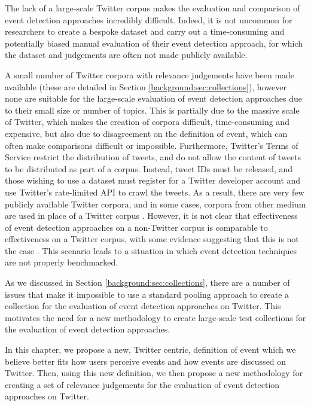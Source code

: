 The lack of a large-scale Twitter corpus makes the evaluation and comparison of event detection approaches incredibly difficult.
Indeed, it is not uncommon for researchers to create a bespoke dataset and carry out a time-consuming and potentially biased manual evaluation of their event detection approach, for which the dataset and judgements are often not made publicly available.

A small number of Twitter corpora with relevance judgements have been made available (these are detailed in Section \ref{background:sec:collections}), however none are suitable for the large-scale evaluation of event detection approaches due to their small size or number of topics.
This is partially due to the massive scale of Twitter, which makes the creation of corpora difficult, time-consuming and expensive, but also due to disagreement on the definition of event, which can often make comparisons difficult or impossible.
Furthermore, Twitter's Terms of Service restrict the distribution of tweets, and do not allow the content of tweets to be distributed as part of a corpus.
Instead, tweet IDs must be released, and those wishing to use a dataset must register for a Twitter developer account and use Twitter's rate-limited API to crawl the tweets.
As a result, there are very few publicly available Twitter corpora, and in some cases, corpora from other medium are used in place of a Twitter corpus \citep{Aggarwal12,Petrovic:2010:SFS:1857999.1858020,Petrovic:2012:UPI:2382029.2382072}.
However, it is not clear that effectiveness of event detection approaches on a non-Twitter corpus is comparable to effectiveness on a Twitter corpus, with some evidence suggesting that this is not the case \citep{Petrovic:2012:UPI:2382029.2382072}.
This scenario leads to a situation in which event detection techniques are not properly benchmarked.

As we discussed in Section \ref{background:sec:collections}, there are a number of issues that make it impossible to use a standard pooling approach to create a collection for the evaluation of event detection approaches on Twitter.
This motivates the need for a new methodology to create large-scale test collections for the evaluation of event detection approaches.

In this chapter, we propose a new, Twitter centric, definition of event which we believe better fits how users perceive events and how events are discussed on Twitter.
Then, using this new definition, we then propose a new methodology for creating a set of relevance judgements for the evaluation of event detection approaches on Twitter.

